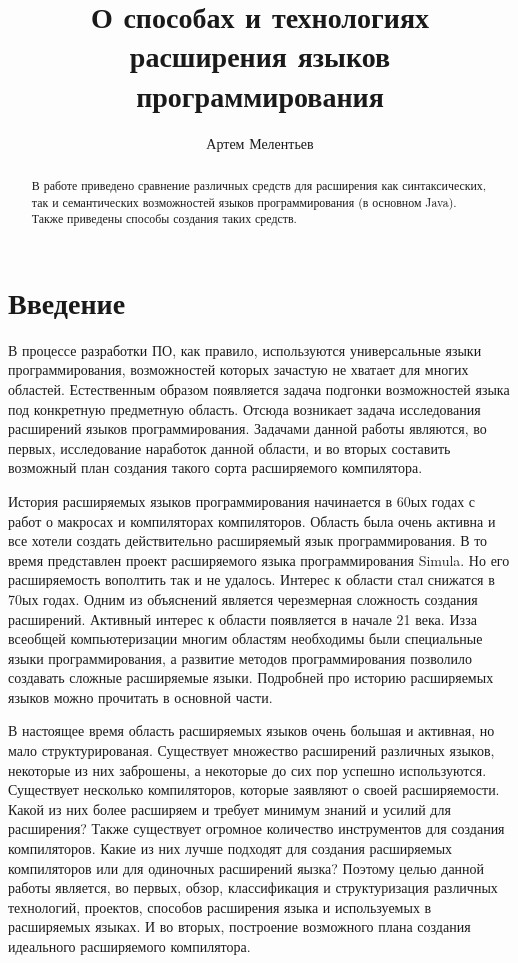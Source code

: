 \documentclass[a4paper,12pt]{article}
\begin{document}
\title{О способах и технологиях расширения языков программирования}
\author{Артем Мелентьев}
\maketitle

\begin{abstract}
В работе приведено сравнение различных средств для расширения как
синтаксических, так и семантических возможностей языков программирования (в
основном Java). Также приведены способы создания таких средств.
\end{abstract}

\tableofcontents

\section{Введение}

В процессе разработки ПО, как правило, используются универсальные языки
программирования, возможностей которых зачастую не хватает для многих областей.
Естественным образом появляется задача подгонки возможностей языка под
конкретную предметную область. Отсюда возникает задача исследования расширений
языков программирования. Задачами данной работы являются, во первых,
исследование наработок данной области, и во вторых составить возможный план
создания такого сорта расширяемого компилятора.

История расширяемых языков программирования начинается в 60ых годах с работ о
макросах и компиляторах компиляторов. Область была очень активна и все хотели
создать действительно расширяемый язык программирования. В то время
представлен проект расширяемого языка программирования Simula. Но его
расширяемость вополтить так и не удалось. Интерес к области стал снижатся в 70ых
годах. Одним из объяснений является черезмерная сложность создания расширений.
Активный интерес к области появляется в начале 21 века. Изза всеобщей
компьютеризации многим областям необходимы были специальные языки
программирования, а развитие методов программирования позволило создавать
сложные расширяемые языки. Подробней про историю расширяемых языков можно
прочитать в основной части.

В настоящее время область расширяемых языков очень большая и активная, но мало
структурированая. Существует множество расширений различных языков, некоторые из
них заброшены, а некоторые до сих пор успешно используются. Существует несколько
компиляторов, которые заявляют о своей расширяемости. Какой из них более
расширяем и требует минимум знаний и усилий для расширения? Также существует
огромное количество инструментов для создания компиляторов. Какие из них лучше
подходят для создания расширяемых компиляторов или для одиночных расширений яызка?
Поэтому целью данной работы является, во первых, обзор, классификация и
структуризация различных технологий, проектов, способов расширения языка и
используемых в расширяемых языках. И во вторых, построение возможного плана
создания идеального расширяемого компилятора.
\end{document}
